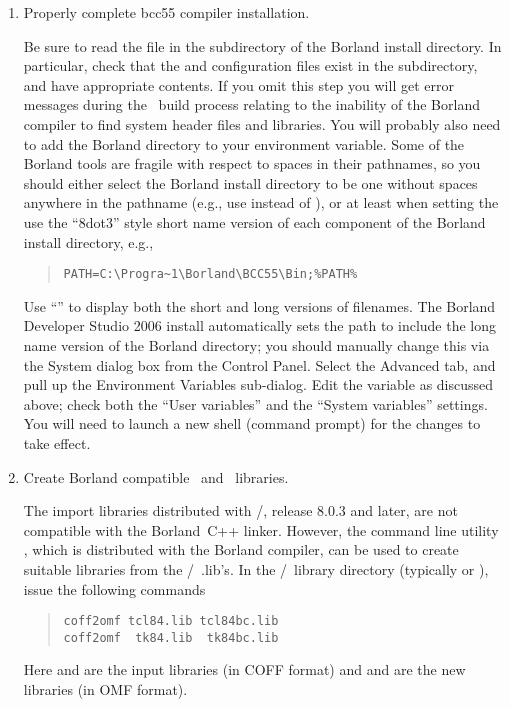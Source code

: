 \begin{enumerate}
\item Properly complete bcc55 compiler installation.

Be sure to read the  file in the 
subdirectory of the Borland install directory.  In particular, check
that the  and  configuration files exist
in the  subdirectory, and have appropriate contents.  If you
omit this step you will get error messages during the \OOMMF\ build
process relating to the inability of the Borland compiler to find
system header files and libraries.  You will probably also need to add
the Borland  directory to your  environment variable.
Some of the Borland tools are fragile with respect to spaces in their
pathnames, so you should either select the Borland install directory
to be one without spaces anywhere in the pathname (e.g., use
 instead of
), or at least when setting
the  use the ``8dot3'' style short name version of each
component of the Borland install directory, e.g.,
\begin{quote}
\begin{verbatim}
PATH=C:\Progra~1\Borland\BCC55\Bin;%PATH%
\end{verbatim}
\end{quote}
Use ``'' to display both the short and long versions of
filenames.  The Borland Developer Studio 2006 install automatically sets
the path to include the long name version of the Borland 
directory; you should manually change this via the System dialog box
from the Control Panel.  Select the Advanced tab, and pull up the
Environment Variables sub-dialog.  Edit the  variable as
discussed above; check both the ``User variables'' and the ``System
variables'' settings.  You will need to launch a new shell (command
prompt) for the changes to take effect.

\item Create Borland compatible \Tcl\ and \Tk\ libraries.

The import libraries distributed with \Tcl/\Tk, release 8.0.3 and later,
are not compatible with the Borland~C++ linker.  However, the command
line utility , which is distributed with
the Borland compiler, can be used to create suitable libraries from
the \Tcl/\Tk\ .lib's.  In the \Tcl/\Tk\ library directory (typically
 or ),
issue the following commands
\begin{quote}
\begin{verbatim}
coff2omf tcl84.lib tcl84bc.lib
coff2omf  tk84.lib  tk84bc.lib
\end{verbatim}
\end{quote}
Here  and  are the input libraries (in COFF
format) and  and  are the new libraries
(in OMF format).


\end{enumerate}
